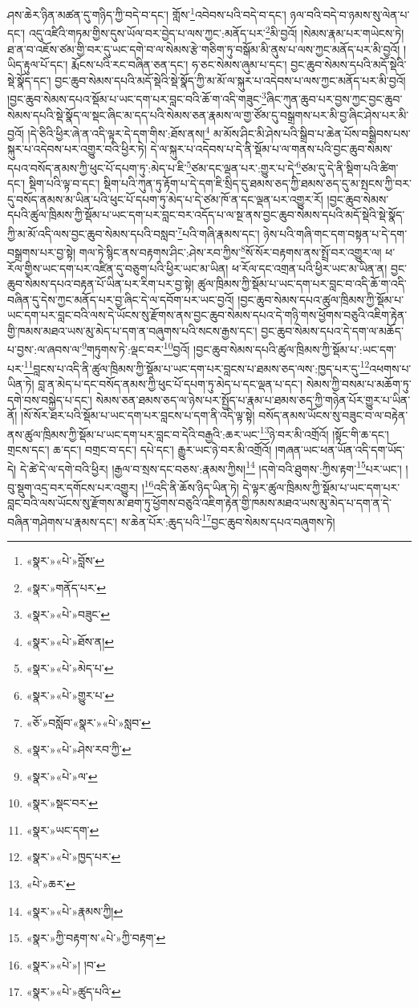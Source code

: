 ཤས་ཆེར་ཉིན་མཚན་དུ་གཉིད་ཀྱི་བདེ་བ་དང་། གློས་\footnote{«སྣར་»«པེ་»བློས་}འབེབས་པའི་བདེ་བ་དང་། ཉལ་བའི་བདེ་བ་ཉམས་སུ་ལེན་པ་དང་། འདུ་འཛིའི་གཏམ་གྱིས་དུས་ཡོལ་བར་བྱེད་པ་ལས་ཀྱང་:མནོད་པར་\footnote{«སྣར་»གནོད་པར་}མི་བྱའོ། །སེམས་རྣམ་པར་གཡེངས་ཏེ། ཐ་ན་བ་འཇོས་ཙམ་གྱི་བར་དུ་ཡང་དགེ་བ་ལ་སེམས་རྩེ་གཅིག་ཏུ་བསྒོམ་མི་ནུས་པ་ལས་ཀྱང་མནོད་པར་མི་བྱའོ། །ཡིད་རྟུལ་པོ་དང་། རྨོངས་པའི་རང་བཞིན་ཅན་དང་། ཧ་ཅང་སེམས་ཞུམ་པ་དང་། བྱང་ཆུབ་སེམས་དཔའི་མདོ་སྡེའི་སྡེ་སྣོད་དང་། བྱང་ཆུབ་སེམས་དཔའི་མདོ་སྡེའི་སྡེ་སྣོད་ཀྱི་མ་མོ་ལ་སྐུར་པ་འདེབས་པ་ལས་ཀྱང་མནོད་པར་མི་བྱའོ། །བྱང་ཆུབ་སེམས་དཔའ་སྡོམ་པ་ཡང་དག་པར་བླང་བའི་ཆོ་ག་འདི་གཟུང་\footnote{«སྣར་»«པེ་»བཟུང་}ཞིང་ཀུན་ཆུབ་པར་བྱས་ཀྱང་བྱང་ཆུབ་སེམས་དཔའི་སྡེ་སྣོད་ལ་སྡང་ཞིང་མ་དད་པའི་སེམས་ཅན་རྣམས་ལ་གྱ་ཙོམ་དུ་བསྒྲགས་པར་མི་བྱ་ཞིང་ཤེས་པར་མི་བྱའོ། །དེ་ཅིའི་ཕྱིར་ཞེ་ན་འདི་ལྟར་དེ་དག་གིས་:ཐོས་ནས།\footnote{«སྣར་»«པེ་»ཐོས་ན།} མ་མོས་ཤིང་མི་ཤེས་པའི་སྒྲིབ་པ་ཆེན་པོས་བསྒྲིབས་པས་སྐུར་པ་འདེབས་པར་འགྱུར་བའི་ཕྱིར་ཏེ། དེ་ལ་སྐུར་པ་འདེབས་པ་དེ་ནི་སྡོམ་པ་ལ་གནས་པའི་བྱང་ཆུབ་སེམས་དཔའ་བསོད་ནམས་ཀྱི་ཕུང་པོ་དཔག་ཏུ་:མེད་པ་ཇི་\footnote{«སྣར་»«པེ་»མེད་པ་}ཙམ་དང་ལྡན་པར་:གྱུར་པ་དེ་\footnote{«སྣར་»«པེ་»གྱུར་པ་}ཙམ་དུ་དེ་ནི་སྡིག་པའི་ཚིག་དང་། སྡིག་པའི་ལྟ་བ་དང་། སྡིག་པའི་ཀུན་ཏུ་རྟོག་པ་དེ་དག་ཇི་སྲིད་དུ་ཐམས་ཅད་ཀྱི་ཐམས་ཅད་དུ་མ་སྤངས་ཀྱི་བར་དུ་བསོད་ནམས་མ་ཡིན་པའི་ཕུང་པོ་དཔག་ཏུ་མེད་པ་དེ་ཙམ་ཁོ་ན་དང་ལྡན་པར་འགྱུར་རོ། །བྱང་ཆུབ་སེམས་དཔའི་ཚུལ་ཁྲིམས་ཀྱི་སྡོམ་པ་ཡང་དག་པར་བླང་བར་འདོད་པ་ལ་སྔ་ནས་བྱང་ཆུབ་སེམས་དཔའི་མདོ་སྡེའི་སྡེ་སྣོད་ཀྱི་མ་མོ་འདི་ལས་བྱང་ཆུབ་སེམས་དཔའི་བསླབ་\footnote{«ཅོ་»བསློབ་«སྣར་»«པེ་»སླབ་}པའི་གཞི་རྣམས་དང་། ཉེས་པའི་གཞི་གང་དག་བསྟན་པ་དེ་དག་བསྒྲགས་པར་བྱ་སྟེ། གལ་ཏེ་སྙིང་ནས་བརྟགས་ཤིང་:ཤེས་རབ་ཀྱིས་\footnote{«སྣར་»«པེ་»ཤེས་རབ་ཀྱི་}སོ་སོར་བརྟགས་ནས་སྤྲོ་བར་འགྱུར་ལ། ཕ་རོལ་གྱིས་ཡང་དག་པར་འཛིན་དུ་བཅུག་པའི་ཕྱིར་ཡང་མ་ཡིན། ཕ་རོལ་དང་འགྲན་པའི་ཕྱིར་ཡང་མ་ཡིན་ན། བྱང་ཆུབ་སེམས་དཔའ་བརྟན་པོ་ཡིན་པར་རིག་པར་བྱ་སྟེ། ཚུལ་ཁྲིམས་ཀྱི་སྡོམ་པ་ཡང་དག་པར་བླང་བ་འདི་ཆོ་ག་འདི་བཞིན་དུ་དེས་ཀྱང་མནོད་པར་བྱ་ཞིང་དེ་ལ་དབོག་པར་ཡང་བྱའོ། །བྱང་ཆུབ་སེམས་དཔའ་ཚུལ་ཁྲིམས་ཀྱི་སྡོམ་པ་ཡང་དག་པར་བླང་བའི་ལས་དེ་ཡོངས་སུ་རྫོགས་ནས་བྱང་ཆུབ་སེམས་དཔའ་དེ་གཉི་གས་ཕྱོགས་བཅུའི་འཇིག་རྟེན་གྱི་ཁམས་མཐའ་ཡས་མུ་མེད་པ་དག་ན་བཞུགས་པའི་སངས་རྒྱས་དང་། བྱང་ཆུབ་སེམས་དཔའ་དེ་དག་ལ་མཆོད་པ་བྱས་:ལ་ཞབས་ལ་\footnote{«སྣར་»«པེ་»ལ་}གཏུགས་ཏེ་:ལྡང་བར་\footnote{«སྣར་»སྡང་བར་}བྱའོ། །བྱང་ཆུབ་སེམས་དཔའི་ཚུལ་ཁྲིམས་ཀྱི་སྡོམ་པ་:ཡང་དག་པར་\footnote{«སྣར་»ཡང་དག་}བླངས་པ་འདི་ནི་ཚུལ་ཁྲིམས་ཀྱི་སྡོམ་པ་ཡང་དག་པར་བླངས་པ་ཐམས་ཅད་ལས་:ཁྱད་པར་དུ་\footnote{«སྣར་»«པེ་»ཁྱད་པར་}འཕགས་པ་ཡིན་ཏེ། བླ་ན་མེད་པ་དང་བསོད་ནམས་ཀྱི་ཕུང་པོ་དཔག་ཏུ་མེད་པ་དང་ལྡན་པ་དང་། སེམས་ཀྱི་བསམ་པ་མཆོག་ཏུ་དགེ་བས་བསྐྱེད་པ་དང་། སེམས་ཅན་ཐམས་ཅད་ལ་ཉེས་པར་སྤྱོད་པ་རྣམ་པ་ཐམས་ཅད་ཀྱི་གཉེན་པོར་གྱུར་པ་ཡིན་ནོ། །སོ་སོར་ཐར་པའི་སྡོམ་པ་ཡང་དག་པར་བླངས་པ་དག་ནི་འདི་ལྟ་སྟེ། བསོད་ནམས་ཡོངས་སུ་བཟུང་བ་ལ་བརྟེན་ནས་ཚུལ་ཁྲིམས་ཀྱི་སྡོམ་པ་ཡང་དག་པར་བླང་བ་དེའི་བརྒྱའི་:ཆར་ཡང་\footnote{«པེ་»ཆར་}ཉེ་བར་མི་འགྲོའོ། །སྟོང་གི་ཆ་དང་། གྲངས་དང་། ཆ་དང་། བགྲང་བ་དང་། དཔེ་དང་། རྒྱུར་ཡང་ཉེ་བར་མི་འགྲོའོ། །གཞན་ཡང་ཕན་ཡོན་འདི་དག་ཡོད་དེ། དེ་ཚེ་དེ་ལ་དགེ་བའི་ཕྱིར། །རྒྱལ་བ་སྲས་དང་བཅས་:རྣམས་ཀྱིས།\footnote{«སྣར་»«པེ་»རྣམས་ཀྱི།} །དགེ་བའི་ཐུགས་:ཀྱིས་རྟག་\footnote{«སྣར་»ཀྱི་བརྟག་ས་«པེ་»ཀྱི་བརྟག་}པར་ཡང་། །བུ་སྡུག་འདྲ་བར་དགོངས་པར་འགྱུར། །\footnote{«སྣར་»«པེ་»། །བ་}འདི་ནི་ཆོས་ཉིད་ཡིན་ཏེ། དེ་ལྟར་ཚུལ་ཁྲིམས་ཀྱི་སྡོམ་པ་ཡང་དག་པར་བླང་བའི་ལས་ཡོངས་སུ་རྫོགས་མ་ཐག་ཏུ་ཕྱོགས་བཅུའི་འཇིག་རྟེན་གྱི་ཁམས་མཐའ་ཡས་མུ་མེད་པ་དག་ན་དེ་བཞིན་གཤེགས་པ་རྣམས་དང་། ས་ཆེན་པོར་:ཆུད་པའི་\footnote{«སྣར་»«པེ་»ཚུད་པའི་}བྱང་ཆུབ་སེམས་དཔའ་བཞུགས་ཏེ། 